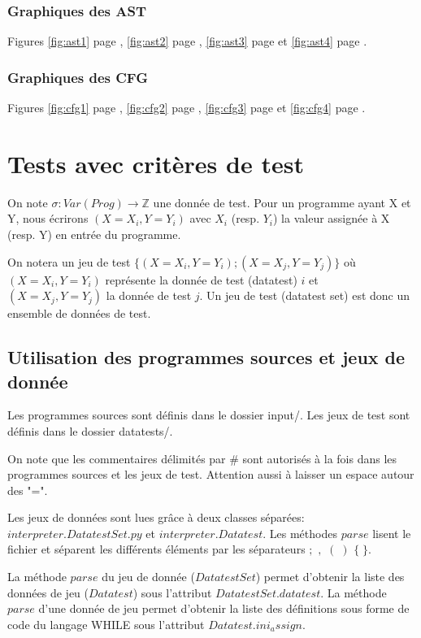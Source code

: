 \documentclass[a4paper]{article}
\begin{document}
\subsubsection{Graphiques des AST}

Figures \ref{fig:ast1} page \pageref{fig:ast1}, \ref{fig:ast2} page \pageref{fig:ast2}, \ref{fig:ast3} page \pageref{fig:ast3} et \ref{fig:ast4} page \pageref{fig:ast4}.

\subsubsection{Graphiques des CFG}

Figures \ref{fig:cfg1} page \pageref{fig:cfg1}, \ref{fig:cfg2} page \pageref{fig:cfg2}, \ref{fig:cfg3} page \pageref{fig:cfg3} et \ref{fig:cfg4} page \pageref{fig:cfg4}.

\section{Tests avec critères de test}

On note $\sigma : Var(Prog) \rightarrow \mathbb{Z} $ une donnée de test. Pour un programme ayant X et Y, nous écrirons $(X=X_i, Y=Y_i)$ avec $X_i$ (resp. $Y_i$) la valeur assignée à X (resp. Y) en entrée du programme.

On notera un jeu de test $\{(X=X_i, Y=Y_i);(X=X_j, Y=Y_j)\}$ où $(X=X_i, Y=Y_i)$ représente la donnée de test (datatest) $i$ et $(X=X_j, Y=Y_j)$ la donnée de test $j$. Un jeu de test (datatest set) est donc un ensemble de données de test.

\subsection{Utilisation des programmes sources et jeux de donnée}

Les programmes sources sont définis dans le dossier input/. 
Les jeux de test sont définis dans le dossier datatests/. 

On note que les commentaires délimités par \# sont autorisés à la fois dans les programmes sources et les jeux de test. Attention aussi à laisser un espace autour des "=". 

Les jeux de données sont lues grâce à deux classes séparées: $interpreter.DatatestSet.py$ et $interpreter.Datatest$. Les méthodes $parse$ lisent le fichier et séparent les différents éléments par les séparateurs $;$  $,$  $(\;)$  $\{\;\}$.

La méthode $parse$ du jeu de donnée ($DatatestSet$) permet d'obtenir la liste des données de jeu ($Datatest$) sous l'attribut $DatatestSet.datatest$. La méthode $parse$ d'une donnée de jeu permet d'obtenir la liste des définitions sous forme de code du langage WHILE sous l'attribut $Datatest.ini_assign$.
\end{document}
